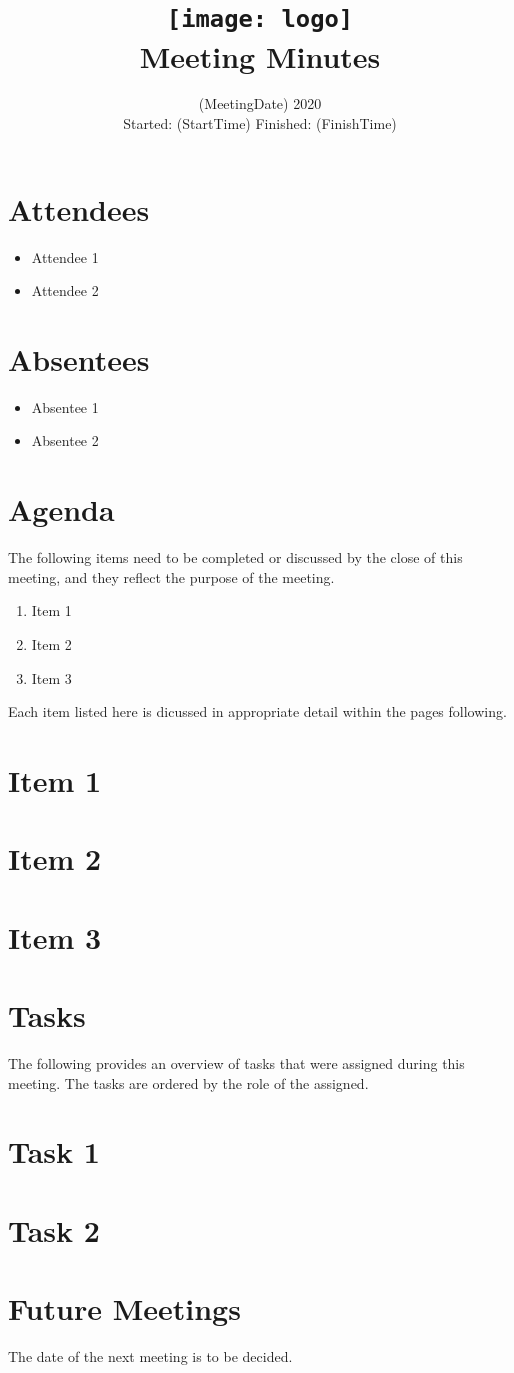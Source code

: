 \documentclass[12pt, a4paper]{article}
\title{
	\texttt{[image: logo]}\vspace{2ex} 
	\\ 
	\titlefont Meeting Minutes\vspace{-3ex}
}
\date{
\huge (MeetingDate) 2020 \\ \vspace{0.5ex}
\large Started: (StartTime) \quad Finished: (FinishTime)}
\begin{document}
\maketitle
\begin{minipage}[t]{0.5\textwidth}
\section*{Attendees}
\begin{itemize}
\item Attendee 1
\item Attendee 2
\end{itemize}
\end{minipage}
\begin{minipage}[t]{0.5\textwidth}
\section*{Absentees}
\begin{itemize}
\item Absentee 1
\item Absentee 2
\end{itemize}
\end{minipage}
\pagebreak
\section*{Agenda}
The following items need to be completed or discussed by the close of this meeting, and they reflect the purpose of the meeting.
\begin{enumerate}
\item Item 1
\item Item 2
\item Item 3
\end{enumerate}
Each item listed here is dicussed in appropriate detail within the pages following.
\pagebreak
\section{Item 1}
\section{Item 2}
\section{Item 3}
\pagebreak
\section*{Tasks}
The following provides an overview of tasks that were assigned during this meeting. The tasks are ordered by the role of the assigned.
\setcounter{section}{0}
\section{Task 1}
\section{Task 2}
\section*{Future Meetings}
The date of the next meeting is to be decided.
\end{document}

